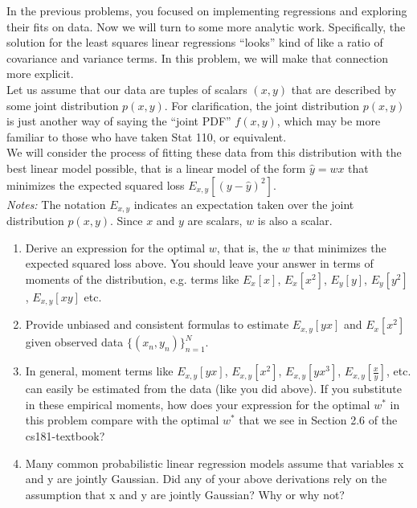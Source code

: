 \documentclass[submit]{harvardml}
\begin{document}
\newpage
\begin{problem}

  In the previous problems, you focused on implementing regressions
  and exploring their fits on data. Now we will turn to some more
  analytic work.  Specifically, the solution for the least squares
  linear regressions ``looks'' kind of like a ratio of covariance and
  variance terms.  In this problem, we will make that connection more
  explicit. \\

  \noindent Let us assume that our data are tuples of scalars $(x,y)$ that are
  described by some joint distribution $p(x,y)$.  For clarification, the joint distribution $p(x,y)$ is just another way of saying the ``joint PDF'' $f(x,y)$, which may be more familiar to those who have taken Stat 110, or equivalent. \\
  
  \noindent We will consider the process of fitting these data from this distribution with the best linear model
  possible, that is a linear model of the form $\hat{y} = wx$ that
  minimizes the expected squared loss $E_{x,y}[ ( y - \hat{y} )^2
  ]$.\\

\noindent \emph{Notes:} The notation $E_{x, y}$ indicates an
expectation taken over the joint distribution $p(x,y)$.  Since $x$ and
$y$ are scalars, $w$ is also a scalar.
  
  \begin{enumerate}

  \item Derive an expression for the optimal $w$, that is, the $w$
    that minimizes the expected squared loss above.  You should leave
    your answer in terms of moments of the distribution, e.g. terms
    like $E_x[x]$, $E_x[x^2]$, $E_y[y]$, $E_y[y^2]$, $E_{x,y}[xy]$
    etc.

\item Provide unbiased and consistent formulas to estimate $E_{x, y}[yx]$
 and $E_x[x^2]$ given observed data $\{(x_n,y_n)\}_{n=1}^N$.

\item In general, moment terms like $E_{x, y}[yx]$, $E_{x, y}[x^2]$,
  $E_{x, y}[yx^3]$, $E_{x, y}[\frac{x}{y}]$, etc. can easily be
  estimated from the data (like you did above).  If you substitute in
  these empirical moments, how does your expression for the optimal
  $w^*$ in this problem compare with the optimal $w^*$ that we see in
  Section 2.6 of the cs181-textbook?

\item Many common probabilistic linear regression models assume that
  variables x and y are jointly Gaussian.  Did any of your above
  derivations rely on the assumption that x and y are jointly
  Gaussian?  Why or why not?
    
\end{enumerate}
  
\end{problem}
\end{document}

